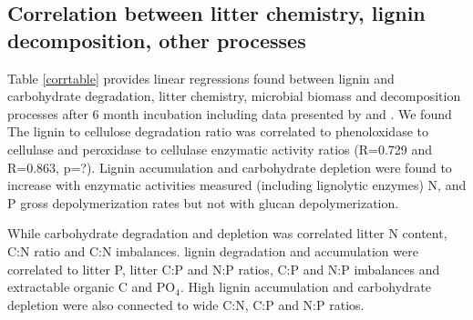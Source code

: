 \documentclass[10pt]{article}
\begin{document}


\subsection*{Correlation between litter chemistry, lignin decomposition, other processes}

Table \ref{corrtable} provides linear regressions found between lignin and carbohydrate degradation, litter chemistry, microbial biomass and decomposition processes after 6 month incubation including data presented by \cite{Mooshammer2011} and \cite{Leitner2011}. We found  The lignin to cellulose degradation ratio was correlated to phenoloxidase to cellulase and peroxidase to cellulase enzymatic activity ratios (R=0.729 and R=0.863, p=?). Lignin accumulation and carbohydrate depletion were found to increase with enzymatic activities measured (including lignolytic enzymes) N, and P gross depolymerization rates but not with glucan depolymerization.

While carbohydrate degradation and depletion was correlated litter N content, C:N ratio and C:N imbalances. lignin degradation and accumulation were correlated to litter P, litter C:P and N:P ratios, C:P and N:P imbalances and extractable organic C and PO$_4$. High lignin accumulation and carbohydrate depletion were also connected to wide C:N, C:P and N:P ratios.
\end{document}
